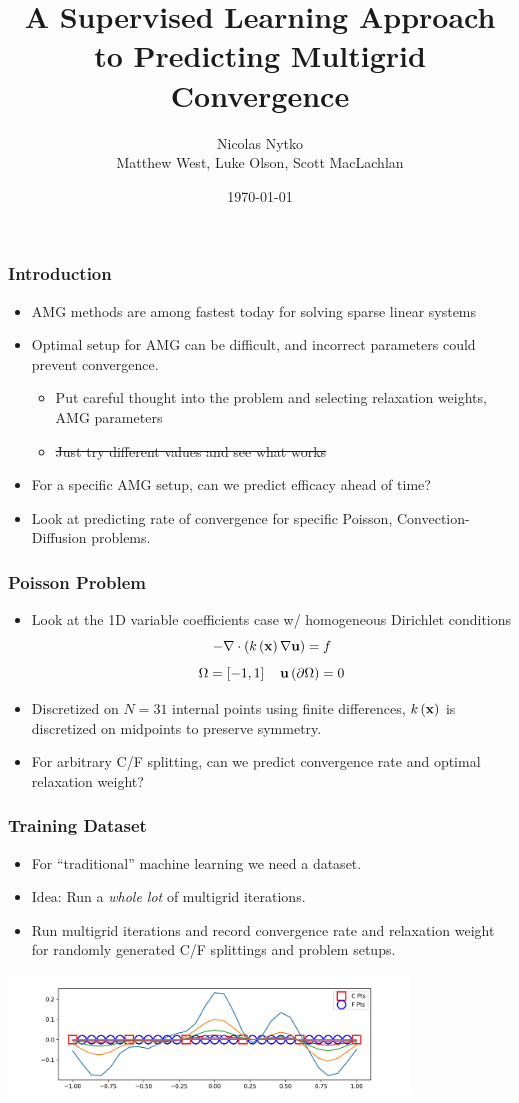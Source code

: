 \documentclass[handout]{beamer}
\title{A Supervised Learning Approach to Predicting Multigrid Convergence}
\author[N. Nytko]{Nicolas Nytko\\[3mm]Matthew West, Luke Olson, Scott MacLachlan}
\date{\today}
\renewcommand{\vec}[1]{ {\bf #1} }
\begin{document}
\frame{\titlepage}


\begin{frame}
  \frametitle{Introduction}
  \begin{itemize}
  \item AMG methods are among fastest today for solving sparse linear systems
  \item Optimal setup for AMG can be difficult, and incorrect parameters could prevent convergence.
    \begin{itemize}
      \item Put careful thought into the problem and selecting relaxation weights, AMG parameters
      \item \st{Just try different values and see what works}
    \end{itemize}
  \item For a specific AMG setup, can we predict efficacy ahead of time?
  \item Look at predicting rate of convergence for specific Poisson, Convection-Diffusion problems.
  \end{itemize}
\end{frame}


\begin{frame}
  \frametitle{Poisson Problem}
  \begin{itemize}
  \item Look at the 1D variable coefficients case w/ homogeneous Dirichlet conditions
    \[ -\nabla \cdot \left(k\left(\vec{x}\right) \nabla \vec{u} \right) = f \]
    \[ \Omega = \left[-1, 1\right] \quad \vec{u}\left(\partial\Omega\right) = 0 \]
  \item Discretized on $N=31$ internal points using finite differences, $k\left(\vec{x}\right)$ is discretized on midpoints to preserve symmetry.
  \item For arbitrary C/F splitting, can we predict convergence rate and optimal relaxation weight?
  \end{itemize}
\end{frame}


\begin{frame}
  \frametitle{Training Dataset}
  \begin{itemize}
  \item For ``traditional'' machine learning we need a dataset.
    \pause
  \item Idea: Run a \textit{whole lot} of multigrid iterations.
    \pause
  \item Run multigrid iterations and record convergence rate and relaxation weight for randomly generated C/F splittings and problem setups.
  \end{itemize}
  \begin{center}
    \includegraphics[width=0.8\textwidth]{figures/multigrid.png}
  \end{center}
\end{frame}
\end{document}
